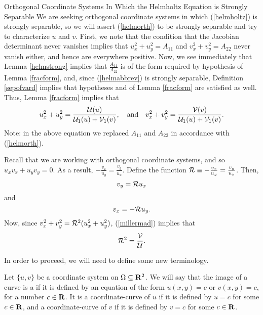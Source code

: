 \begin{section}{Orthogonal Coordinate Systems In Which the Helmholtz Equation is Strongly Separable}
We are seeking orthogonal coordinate systems in which (\ref{helmholtz}) is strongly separable, so we will assert (\ref{helmorth}) to be strongly separable and try to characterize $u$ and $v$.  First, we note that the condition that the Jacobian determinant never vanishes implies that $u_x^2 + u_y^2 = A_{11}$ and $v_x^2 + v_y^2 = A_{22}$ never vanish either, and hence are everywhere positive.  Now, we see immediately that Lemma \ref{helmstrong} implies that $\frac{A_{11}}{A_{22}}$ is of the form required by hypothesis  of Lemma \ref{fracform}, and, since (\ref{helmabbrev}) is strongly separable, Definition \ref{sepofvard} implies that hypotheses  and  of Lemma \ref{fracform} are satisfied as well.  Thus, Lemma \ref{fracform} implies that
\begin{equation}
\label{millermad}
u_x^2 + u_y^2 = \frac{\mathcal{U}(u)}{\mathcal{U}_1(u) + \mathcal{V}_1(v)},
\quad \mbox{and} \quad
v_x^2 + v_y^2 = \frac{\mathcal{V}(v)}{\mathcal{U}_1(u) + \mathcal{V}_1(v)}.
\end{equation}
Note: in the above equation we replaced $A_{11}$ and $A_{22}$ in accordance with (\ref{helmorth}).

Recall that we are working with orthogonal coordinate systems, and so $u_x v_x + u_y v_y = 0$.  As a result, $-\frac{v_x}{u_y} = \frac{v_y}{u_x}$.  Define the function $\mathcal{R} \equiv -\frac{v_x}{u_y} = \frac{v_y}{u_x}$.  Then,
\begin{equation}
\label{vye}
v_y = \mathcal{R} u_x
\end{equation}
and
\begin{equation}
\label{vxe}
v_x = - \mathcal{R} u_y.
\end{equation}
Now, since $v_x^2 + v_y^2 = \mathcal{R}^2(u_x^2 + u_y^2)$, (\ref{millermad}) implies that
\begin{equation}
\label{cR2}
\mathcal{R}^2 = \frac{\mathcal{V}}{\mathcal{U}}.
\end{equation}

In order to proceed, we will need to define some new terminology.

\begin{definition}
\label{coordcurve}
Let $\{ u,v \}$ be a coordinate system on $\Omega \subseteq \mathbf{R}^2$.  We will say that the image of a curve is a  if it is defined by an equation of the form $u(x,y) = c$ or $v(x,y) = c$, for a number $c \in \mathbf{R}$.  It is a coordinate-curve of $u$ if it is defined by $u = c$ for some $c \in \mathbf{R}$, and a coordinate-curve of $v$ if it is defined by $v = c$ for some $c \in \mathbf{R}$.
\end{definition}


\end{section}
